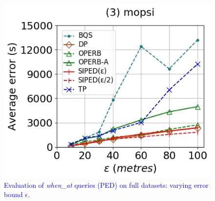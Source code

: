 {\begin{figure}[tb!]
	\includegraphics[scale = 0.250]{Figures/Exp-when-PED-error-epsilon-mopsi.jpg}
	\vspace{-1ex}
	\caption{\small \textcolor{blue}{Evaluation of \emph{when\_at} queries (PED) on full datasets: varying error bound $\epsilon$.}}
	\label{fig:query-when-ped-epsilon}
	\vspace{-1.0ex}
\end{figure}

}
